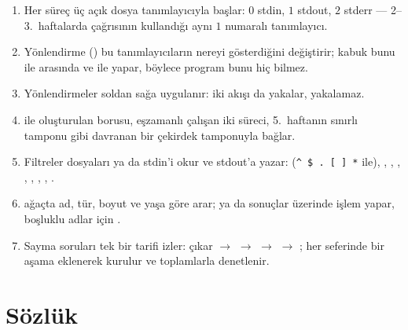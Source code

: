 \begin{keyidea}
\begin{enumerate}[leftmargin=1.4em]
  \item Her süreç üç açık dosya tanımlayıcıyla başlar: $0$ stdin, $1$ stdout, $2$ stderr --- 2--3.~haftalarda  çağrısının kullandığı aynı $1$ numaralı tanımlayıcı.
  \item Yönlendirme () bu tanımlayıcıların nereyi gösterdiğini değiştirir; kabuk bunu  ile  arasında  ve  ile yapar, böylece program bunu hiç bilmez.
  \item Yönlendirmeler soldan sağa uygulanır:  iki akışı da yakalar,  yakalamaz.
  \item {} ile oluşturulan  borusu, eşzamanlı çalışan iki süreci, 5.~haftanın sınırlı tamponu gibi davranan bir çekirdek tamponuyla bağlar.
  \item Filtreler dosyaları ya da stdin'i okur ve stdout'a yazar:  (\texttt{\textasciicircum\ \$ . [ ] *} ile), , , , , , , , .
  \item {} ağaçta ad, tür, boyut ve yaşa göre arar;  ya da  sonuçlar üzerinde işlem yapar, boşluklu adlar için .
  \item Sayma soruları tek bir tarifi izler: çıkar $\to$  $\to$  $\to$  $\to$ ; her seferinde bir aşama eklenerek kurulur ve toplamlarla denetlenir.
\end{enumerate}
\end{keyidea}

\section{Sözlük}

